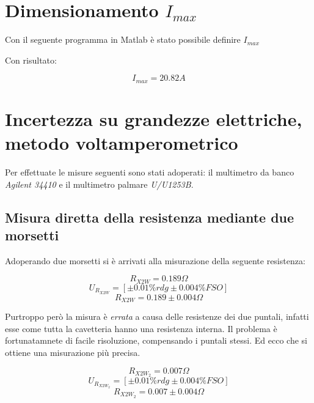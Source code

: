 \documentclass[a4paper]{article}
\begin{document}
\section{Dimensionamento $I_{max}$}
Con il seguente programma in Matlab è stato possibile definire $I_{max}$



Con risultato: 
\begin{Large}
	\begin{equation}
		I_{max} = 20.82 A
	 \end{equation}
\end{Large}


\section {Incertezza su grandezze elettriche, metodo voltamperometrico}
Per effettuate le misure seguenti sono stati adoperati: il multimetro da banco \emph{Agilent 34410} e il multimetro palmare \emph{U/U1253B}.
\subsection{Misura diretta della resistenza mediante due morsetti}
Adoperando due morsetti si è arrivati alla misurazione della seguente resistenza:
\begin{Large}
	\begin{equation}
		R_{X2W}= 0.189 \Omega
	\end{equation}
	\begin{equation}
		U_{R_{X2W}} = [\pm 0.01\%rdg \pm 0.004\% FSO]
	 \end{equation}
	 \begin{equation}
		R_{X2W} = 0.189 \pm 0.004 \Omega
	 \end{equation}
\end{Large}
Purtroppo però la misura è \emph{errata} a causa delle resistenze dei due puntali, infatti esse come tutta la cavetteria hanno una resistenza interna.
Il problema è fortunatamnete di facile risoluzione, compensando i puntali stessi. Ed ecco che si ottiene una misurazione più precisa.

\begin{Large}
	\begin{equation}
		R_{X2W_{2}} = 0.007 \Omega
	 \end{equation}
	\begin{equation}
		U_{R_{X2W_{2}}} = [\pm 0.01\%rdg \pm 0.004\% FSO]
	 \end{equation}
	 \begin{equation}
		R_{X2W_{2}} = 0.007 \pm 0.004 \Omega
	 \end{equation}
\end{Large}
\end{document}
